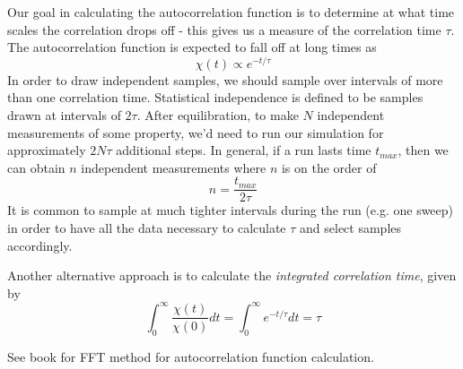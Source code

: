 \documentclass{article}
\begin{document}
Our goal in calculating the autocorrelation function is to determine at what time scales the correlation drops off -
this gives us a measure of the correlation time $\tau$. The autocorrelation function is expected to fall off
at long times as
$$\chi(t) \propto e^{-t/\tau}$$
In order to draw independent samples, we should sample over intervals of more than one correlation time. Statistical
independence is defined to be samples drawn at intervals of $2\tau$. After equilibration, to make $N$ independent
measurements of some property, we'd need to run our simulation for approximately $2N\tau$ additional steps. In
general, if a run lasts time $t_{max}$, then we can obtain $n$ independent measurements where
$n$ is on the order of
$$n = \frac{t_{max}}{2\tau}$$
It is common to sample at much tighter intervals during the run (e.g. one sweep) in order to have all the data necessary to
calculate $\tau$ and select samples accordingly.

Another alternative approach is to calculate the \emph{integrated correlation time}, given by
$$\int_{0}^{\infty} \frac{\chi(t)}{\chi(0)}dt = \int_{0}^{\infty}e^{-t/\tau}dt = \tau$$

See book for FFT method for autocorrelation function calculation.
\end{document}

